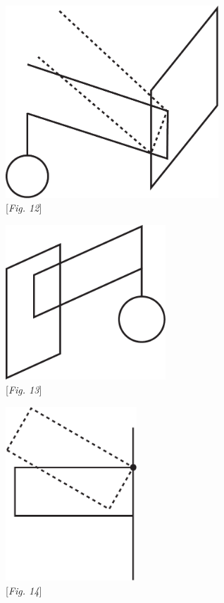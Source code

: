 \begin{minipage}[t]{0.5\textwidth}
\noindent
\centering
\hspace{-16mm}\includegraphics[width=0.60\textwidth]{images/LH037,05_207r-d4.pdf}
\\
 \vspace*{0.5em}
\hspace{-16mm}%
[\textit{Fig. 12}]
\end{minipage}
\pend
\newpage
%
%
\pstart
\begin{minipage}[t]{0.5\textwidth}
\noindent
\centering
\hspace{-16mm}\includegraphics[width=0.45\textwidth]{images/LH037,05_207r-d6.pdf}
\\
 \vspace*{0.5em}
\hspace{-16mm}[\textit{Fig. 13}]
\end{minipage}
\begin{minipage}[t]{0.5\textwidth}
\noindent
\centering
\hspace{-16mm}\includegraphics[width=0.37\textwidth]{images/LH037,05_207r-d7.pdf}
\\
 \vspace*{0.5em}
\hspace{-16mm}[\textit{Fig. 14}]
\end{minipage}
